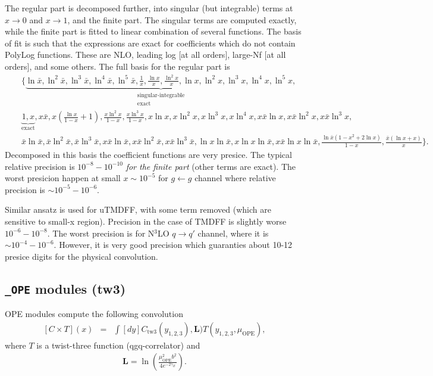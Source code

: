 \documentclass[prd,nofootinbib,eqsecnum,final]{revtex4}
\newcommand{\nn}{\nonumber}
\newcommand{\ot}{\leftarrow}
\renewcommand{\(}{\left(}
\renewcommand{\)}{\right)}
\renewcommand{\[}{\left[}
\renewcommand{\]}{\right]}
\begin{document}
The regular part is decomposed further, into singular (but integrable) terms at $x\to0 $ and $x\to 1$, and the finite part. The singular terms are computed exactly, while the finite part is fitted to linear combination of several functions. The basis of fit is such that the expressions are exact for coefficients which do not contain PolyLog functions. These are NLO, leading log [at all orders], large-Nf [at all orders], and some others. The full basis for the regular part is
\begin{eqnarray}
&&\Big\{\underbrace{\ln \bar x,\ln^2\bar x,\ln^3\bar x,\ln^4\bar x,\ln^5\bar x,
\frac{1}{x},\frac{\ln x}{x},\frac{\ln^2x}{x},
\ln x,\ln^2x,\ln^3x,\ln^4x,\ln^5x,}_{\substack{\text{singular-integrable} \\ \text{exact}}}
\\\nn&&
\underbrace{1,x}_{\text{exact}},x\bar x ,
x\(\frac{\ln x}{1-x}+1\), \frac{x \ln^2x}{1-x}, \frac{x\ln^3x}{1-x},
x\ln x,x\ln^2x,x\ln^3x,x\ln^4x,
x\bar x\ln x,x\bar x\ln^2x,x\bar x\ln^3x,
\\\nn &&
\bar x\ln\bar x,\bar x\ln^2\bar x,\bar x\ln^3\bar x,
x\bar x\ln\bar x,x\bar x\ln^2\bar x,x\bar x\ln^3\bar x,
\ln x\ln\bar x,x\ln x\ln\bar x,x\bar x\ln x\ln\bar x,
\frac{\ln\bar x(1-x^2+2\ln x)}{1-x},
\frac{\bar x(\ln x+x)}{x}
\Big\}.
\end{eqnarray}
Decomposed in this basis the coefficient functions are very presice. The typical relative precision is $10^{-8}-10^{-10}$ \textit{for the finite part} (other terms are exact). The worst presicion happen at small $x\sim 10^{-5}$ for $g\ot g$ channel where relative precision is $\sim 10^{-5}-10^{-6}$.

Similar ansatz is used for uTMDFF, with some term removed (which are sensitive to small-x region). Precision in the case of TMDFF is slightly worse $10^{-6}-10^{-8}$. The worst precision is for N$^3$LO $q\to q'$ channel, where it is $\sim 10^{-4}-10^{-6}$. However, it is very good precision which guaranties about 10-12 presice digits for the physical convolution.

\subsection{\texttt{\_OPE} modules (tw3)}
\label{TMD_OPE_tw3}

OPE modules compute the following convolution
\begin{eqnarray}\label{OPE:tw3:main}
[C\times T](x)&=&\int [dy] C_{\text{tw3}}(y_{1,2,3}),\mathbf{L})T\(y_{1,2,3},\mu_{\text{OPE}}\),
\end{eqnarray}
where $T$ is a twist-three function (qgq-correlator) and
\begin{eqnarray}
\mathbf{L}=\ln\(\frac{\mu^2_{\text{OPE}}b^2}{4e^{-2\gamma_E}}\).
\end{eqnarray}
\end{document}
